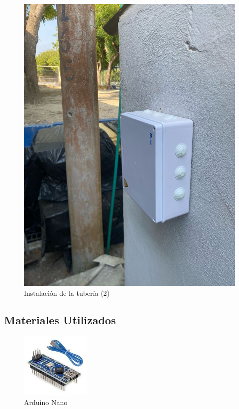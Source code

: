 \documentclass[12pt]{article}
\begin{document}
\begin{figure}[h!]
\begin{minipage}[b]{0.48\textwidth}
            \includegraphics[width=\textwidth]{imagenes/box.jpg}
            \caption{Instalación de la tubería (2)}
            \label{fig:box}
      \end{minipage}
\end{figure}

\clearpage %

\subsection*{Materiales Utilizados}
\begin{figure}[h!]
      \centering
      \includegraphics[width=0.3\textwidth]{imagenes/arduino.jpg}
      \caption{Arduino Nano}
      \label{fig:arduino}
\end{figure}
\end{document}
